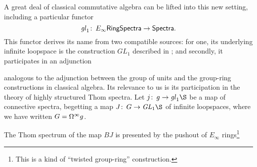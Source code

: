 A great deal of classical commutative algebra can be lifted into this new setting, including a particular functor \[\mathit{gl}_1\colon\thinspace E_\infty\mathsf{RingSpectra} \to \mathsf{Spectra}.\]  This functor derives its name from two compatible sources: for one, its underlying infinite loopspace is the construction $GL_1$ described in ; and secondly, it participates in an adjunction
\begin{center}
\end{center}
analogous to the adjunction between the group of units and the group-ring constructions in classical algebra.  Its relevance to us is its participation in the theory of highly structured Thom spectra.  Let $j\co g \to \gl_1 \S$ be a map of connective spectra, begetting a map $J\co G \to \GL_1 \S$ of infinite loopspaces, where we have written $G = \Omega^\infty g$.
\begin{lemma}
The Thom spectrum of the map $BJ$ is presented by the pushout of $E_\infty$ rings\footnote{This is a kind of ``twisted group-ring'' construction.}
\begin{center}
\end{center}
\end{lemma}

